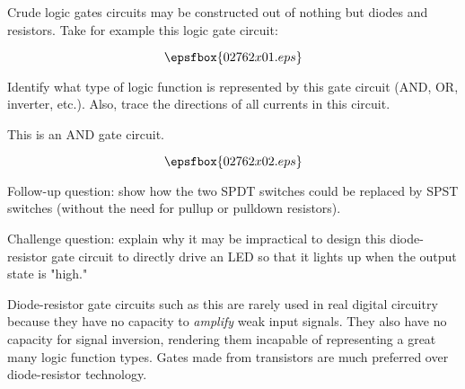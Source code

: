 

Crude logic gates circuits may be constructed out of nothing but diodes and resistors.  Take for example this logic gate circuit:

$$\epsfbox{02762x01.eps}$$

Identify what type of logic function is represented by this gate circuit (AND, OR, inverter, etc.).  Also, trace the directions of all currents in this circuit.







This is an AND gate circuit.

$$\epsfbox{02762x02.eps}$$

\vskip 10pt

Follow-up question: show how the two SPDT switches could be replaced by SPST switches (without the need for pullup or pulldown resistors).

\vskip 10pt

Challenge question: explain why it may be impractical to design this diode-resistor gate circuit to directly drive an LED so that it lights up when the output state is "high."







Diode-resistor gate circuits such as this are rarely used in real digital circuitry because they have no capacity to {\it amplify} weak input signals.  They also have no capacity for signal inversion, rendering them incapable of representing a great many logic function types.  Gates made from transistors are much preferred over diode-resistor technology.




